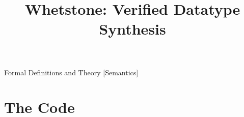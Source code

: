 \documentclass[preprint]{sigplanconf}
\begin{document}
\title{Whetstone: Verified Datatype Synthesis}

\authorinfo{}


\maketitle

\begin{abstract}



\end{abstract}

               {Formal Definitions and Theory}
               [Semantics]

\keywords















\cleardoublepage

\appendix
\section{The Code}

\end{document}
